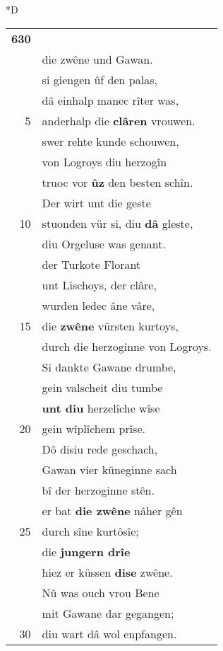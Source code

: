 \documentclass[8pt,a4paper,notitlepage]{article}
\begin{document}
\begin{table}[ht]
\begin{minipage}[t]{0.5\linewidth}
\small
\begin{center}*D
\end{center}
\begin{tabular}{rl}
\textbf{630} & \textit{\begin{large}D\end{large}}iu selben kleider leiten an\\ 
 & die zwêne und Gawan.\\ 
 & si giengen ûf den palas,\\ 
 & dâ einhalp manec rîter was,\\ 
5 & anderhalp die \textbf{clâren} vrouwen.\\ 
 & swer rehte kunde schouwen,\\ 
 & von Logroys diu herzogîn\\ 
 & truoc vor \textbf{ûz} den besten schîn.\\ 
 & Der wirt unt die geste\\ 
10 & stuonden vür si, diu \textbf{dâ} gleste,\\ 
 & diu Orgeluse was genant.\\ 
 & der Turkote Florant\\ 
 & unt Lischoys, der clâre,\\ 
 & wurden ledec âne vâre,\\ 
15 & die \textbf{zwêne} vürsten kurtoys,\\ 
 & durch die herzoginne von Logroys.\\ 
 & Si dankte Gawane drumbe,\\ 
 & gein valscheit diu tumbe\\ 
 & \textbf{unt diu} herzelîche wîse\\ 
20 & gein wîplîchem prîse.\\ 
 & Dô disiu rede geschach,\\ 
 & Gawan vier küneginne sach\\ 
 & bî der herzoginne stên.\\ 
 & er bat \textbf{die zwêne} nâher gên\\ 
25 & durch sîne kurtôsîe;\\ 
 & die \textbf{jungern drîe}\\ 
 & hiez er küssen \textbf{dise} zwêne.\\ 
 & Nû was ouch vrou Bene\\ 
 & mit Gawane dar gegangen;\\ 
30 & diu wart dâ wol enpfangen.\\ 

\end{tabular}
\end{minipage}
\end{table}
\end{document}
